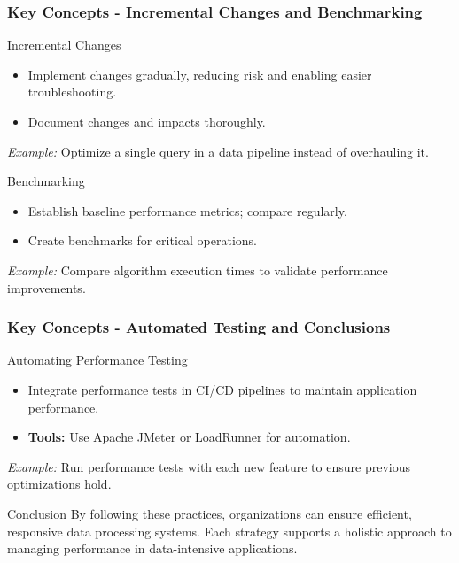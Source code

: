 \documentclass[aspectratio=169]{beamer}
\begin{document}
\begin{frame}[fragile]
    \frametitle{Key Concepts - Incremental Changes and Benchmarking}
    \begin{block}{Incremental Changes}
        \begin{itemize}
            \item Implement changes gradually, reducing risk and enabling easier troubleshooting.
            \item Document changes and impacts thoroughly.
        \end{itemize}
        \textit{Example:} Optimize a single query in a data pipeline instead of overhauling it.
    \end{block}
    
    \begin{block}{Benchmarking}
        \begin{itemize}
            \item Establish baseline performance metrics; compare regularly.
            \item Create benchmarks for critical operations.
        \end{itemize}
        \textit{Example:} Compare algorithm execution times to validate performance improvements.
    \end{block}
\end{frame}

\begin{frame}[fragile]
    \frametitle{Key Concepts - Automated Testing and Conclusions}
    \begin{block}{Automating Performance Testing}
        \begin{itemize}
            \item Integrate performance tests in CI/CD pipelines to maintain application performance.
            \item \textbf{Tools:} Use Apache JMeter or LoadRunner for automation.
        \end{itemize}
        \textit{Example:} Run performance tests with each new feature to ensure previous optimizations hold.
    \end{block}

    \begin{block}{Conclusion}
        By following these practices, organizations can ensure efficient, responsive data processing systems. Each strategy supports a holistic approach to managing performance in data-intensive applications.
    \end{block}
\end{frame}
\end{document}
